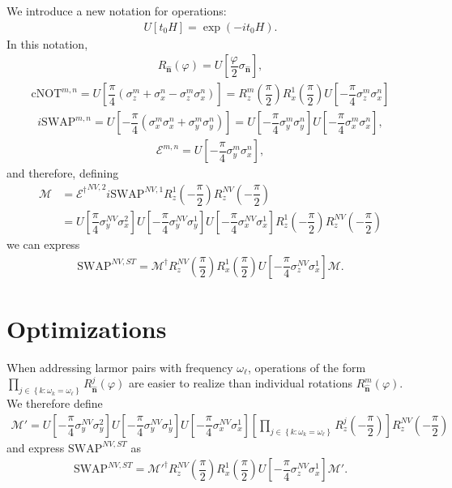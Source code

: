 \documentclass[11pt]{article}
\renewcommand{\t}{\text} %
\newcommand{\f}[2]{\dfrac{#1}{#2}} %
\newcommand{\p}[1]{\left(#1\right)} %
\renewcommand{\sp}[1]{\left[#1\right]} %
\renewcommand{\set}[1]{\left\{#1\right\}} %
\renewcommand{\v}{\bm} %
\newcommand{\uv}[1]{\hat{\v{#1}}} %
\renewcommand{\phi}{\varphi} %
\renewcommand{\l}{\ell} %
\newcommand{\E}{\mathcal E}
\begin{document}
We introduce a new notation for operations:
\begin{align}
  U\sp{t_0H}=\exp\p{-it_0 H}.
\end{align}
In this notation,
\begin{align}
  R_{\uv n}\p\phi=U\sp{\f\phi2\sigma_{\uv n}},
\end{align}
\begin{align}
  \t{cNOT}^{m,n}=U\sp{\f\pi4\p{\sigma_z^m+\sigma_x^n
      -\sigma_z^m\sigma_x^n}} =R_z^m\p{\f\pi2} R_x^1\p{\f\pi2}
  U\sp{-\f\pi4\sigma_z^m\sigma_x^n}
\end{align}
\begin{align}
  i\t{SWAP}^{m,n}=U\sp{-\f\pi4\p{\sigma_x^m\sigma_x^n
      +\sigma_y^m\sigma_y^n}} =U\sp{-\f\pi4\sigma_y^m\sigma_y^n}
  U\sp{-\f\pi4\sigma_x^m\sigma_x^n},
\end{align}
\begin{align}
  \E^{m,n}=U\sp{-\f\pi4\sigma_y^m\sigma_x^n},
\end{align}
and therefore, defining
\begin{align}
  \mathcal M &={\E^\dag}^{NV,2} i\t{SWAP}^{NV,1}
  R_z^1\p{-\f\pi2}R_z^{NV}\p{-\f\pi2} \tag*{} \\
  &=U\sp{\f\pi4\sigma_y^{NV}\sigma_x^2}
  U\sp{-\f\pi4\sigma_y^{NV}\sigma_y^1}
  U\sp{-\f\pi4\sigma_x^{NV}\sigma_x^1}
  R_z^1\p{-\f\pi2}R_z^{NV}\p{-\f\pi2}
\end{align}
we can express
\begin{align}
  \t{SWAP}^{NV,ST}=\mathcal M^\dag R_z^{NV}\p{\f\pi2} R_x^1\p{\f\pi2}
  U\sp{-\f\pi4\sigma_z^{NV}\sigma_x^1} \mathcal M.
\end{align}

\section*{Optimizations}

When addressing larmor pairs with frequency $\omega_\l$, operations of
the form $\prod_{j\in\set{k:\omega_k=\omega_\l}}R_{\uv n}^j\p\phi$ are
easier to realize than individual rotations $R_{\uv n}^m\p\phi$. We
therefore define
\begin{align}
  \mathcal M'=U\sp{-\f\pi4\sigma_y^{NV}\sigma_y^2}
  U\sp{-\f\pi4\sigma_y^{NV}\sigma_y^1}
  U\sp{-\f\pi4\sigma_x^{NV}\sigma_x^1}
  \sp{\prod_{j\in\set{k:\omega_k=\omega_\l}}R_z^j\p{-\f\pi2}}
  R_z^{NV}\p{-\f\pi2}
\end{align}
and express $\t{SWAP}^{NV,ST}$ as
\begin{align}
  \t{SWAP}^{NV,ST}={\mathcal M'}^\dag R_z^{NV}\p{\f\pi2} R_x^1\p{\f\pi2}
  U\sp{-\f\pi4\sigma_z^{NV}\sigma_x^1} \mathcal M'.
\end{align}
\end{document}
